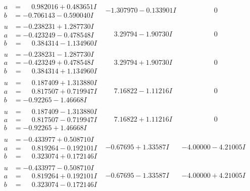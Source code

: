 \documentclass[1p]{elsarticle_modified}
\theoremstyle{definition}
\begin{document}
$$\begin{array}{c|c|c}
\begin{aligned}
a &= \phantom{-}0.982016 + 0.483651 I \\
b &= -0.706143 - 0.590040 I\end{aligned}
 & -1.307970 - 0.133901 I & \phantom{-0.000000 } 0 \\ \hline\begin{aligned}
u &= -0.238231 + 1.287730 I \\
a &= -0.423249 - 0.478548 I \\
b &= \phantom{-}0.384314 - 1.134960 I\end{aligned}
 & \phantom{-}3.29794 - 1.90730 I & \phantom{-0.000000 } 0 \\ \hline\begin{aligned}
u &= -0.238231 - 1.287730 I \\
a &= -0.423249 + 0.478548 I \\
b &= \phantom{-}0.384314 + 1.134960 I\end{aligned}
 & \phantom{-}3.29794 + 1.90730 I & \phantom{-0.000000 } 0 \\ \hline\begin{aligned}
u &= \phantom{-}0.187409 + 1.313880 I \\
a &= \phantom{-}0.817507 + 0.719947 I \\
b &= -0.92265 - 1.46668 I\end{aligned}
 & \phantom{-}7.16822 - 1.11216 I & \phantom{-0.000000 } 0 \\ \hline\begin{aligned}
u &= \phantom{-}0.187409 - 1.313880 I \\
a &= \phantom{-}0.817507 - 0.719947 I \\
b &= -0.92265 + 1.46668 I\end{aligned}
 & \phantom{-}7.16822 + 1.11216 I & \phantom{-0.000000 } 0 \\ \hline\begin{aligned}
u &= -0.433977 + 0.508710 I \\
a &= \phantom{-}0.819264 - 0.192101 I \\
b &= \phantom{-}0.323074 + 0.172146 I\end{aligned}
 & -0.67695 + 1.33587 I & -4.00000 - 4.21005 I \\ \hline\begin{aligned}
u &= -0.433977 - 0.508710 I \\
a &= \phantom{-}0.819264 + 0.192101 I \\
b &= \phantom{-}0.323074 - 0.172146 I\end{aligned}
 & -0.67695 - 1.33587 I & -4.00000 + 4.21005 I \\ \hline\begin{aligned}

\end{aligned}
\end{array}$$
\end{document}
